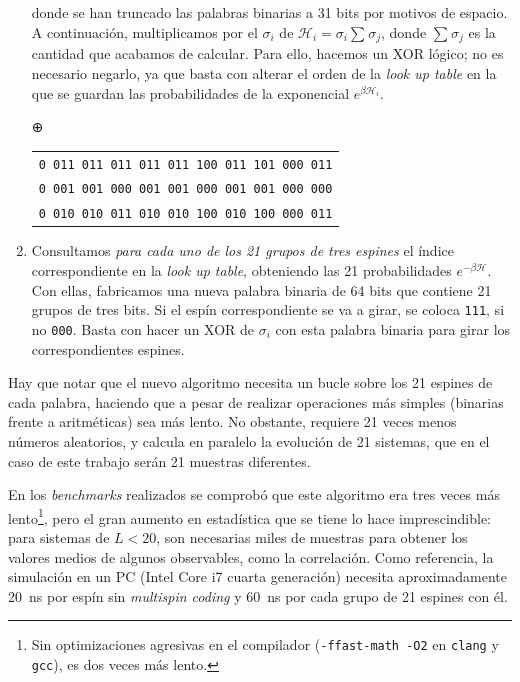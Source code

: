 \documentclass[11pt]{report}
\newcommand{\Ham}{\mathscr{H}}
\begin{document}
\begin{appendices}
\begin{enumerate}
  donde se han truncado las palabras binarias a 31 bits por motivos de espacio.
  A continuación, multiplicamos por el $σ_i$ de
  $\Ham_i = σ_i \sum_{}σ_j$, donde $\sum_{}σ_j$ es la cantidad que
  acabamos de calcular. Para ello, hacemos un XOR lógico; no es
  necesario negarlo, ya que basta con alterar el orden de la
  \textit{look up table} en la que se guardan las probabilidades de la
  exponencial $e^{β\Ham_i}$.

  \begin{minipage}[lc]{1.0\linewidth}
    ⊕
    \begin{tabular}{l}
      \texttt{0 011 011 011 011 011 100 011 101 000 011} \\
      \texttt{0 001 001 000 001 001 000 001 001 000 000} \\ \hline
      \texttt{0 010 010 011 010 010 100 010 100 000 011} \\
    \end{tabular}
  \end{minipage}

\item Consultamos \emph{para cada uno de los 21 grupos de tres
    espines} el índice correspondiente en la \textit{look up table},
  obteniendo las 21 probabilidades $e^{-β \Ham}$. Con ellas,
  fabricamos una nueva palabra binaria de 64 bits que contiene 21 grupos de
  tres bits. Si el espín correspondiente se va a girar, se coloca
  \texttt{111}, si no \texttt{000}. Basta con hacer un XOR de $σ_i$
  con esta palabra binaria para girar los correspondientes espines.
\end{enumerate}

Hay que notar que el nuevo algoritmo necesita un bucle sobre los 21
espines de cada palabra, haciendo que a pesar de realizar operaciones
más simples (binarias frente a aritméticas) sea más lento. No
obstante, requiere 21 veces menos números aleatorios, y calcula en
paralelo la evolución de 21 sistemas, que en el caso de este trabajo
serán 21 muestras diferentes.

En los \textit{benchmarks} realizados se comprobó que este algoritmo
era tres veces más lento\footnote{Sin optimizaciones agresivas en el
  compilador (\texttt{-ffast-math -O2} en \texttt{clang} y
  \texttt{gcc}), es dos veces más lento.}, pero el gran aumento en
estadística que se tiene lo hace imprescindible: para sistemas de
$L<20$, son necesarias miles de muestras para obtener los valores
medios de algunos observables, como la correlación. Como referencia,
la simulación en un PC (Intel Core i7 cuarta generación) necesita
aproximadamente \SI{20}{\nano\second} por espín sin \textit{multispin
  coding} y \SI{60}{\nano\second} por cada grupo de 21 espines con él.


\end{appendices}
\end{document}
